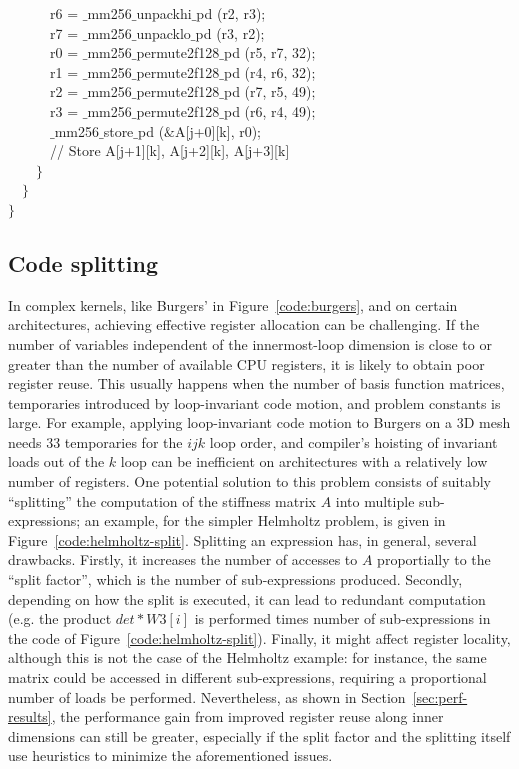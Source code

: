 \documentclass[conference]{IEEEtran}
\begin{document}
\begin{algorithm}[t]
~~~~~~r6 = $\_$mm256$\_$unpackhi$\_$pd (r2, r3);\\
~~~~~~r7 = $\_$mm256$\_$unpacklo$\_$pd (r3, r2);\\
~~~~~~r0 = $\_$mm256$\_$permute2f128$\_$pd (r5, r7, 32);\\
~~~~~~r1 = $\_$mm256$\_$permute2f128$\_$pd (r4, r6, 32);\\
~~~~~~r2 = $\_$mm256$\_$permute2f128$\_$pd (r7, r5, 49);\\
~~~~~~r3 = $\_$mm256$\_$permute2f128$\_$pd (r6, r4, 49);\\
~~~~~~$\_$mm256$\_$store$\_$pd ($\&$A[j+0][k], r0);\\
~~~~~~// Store A[j+1][k], A[j+2][k], A[j+3][k]\\
~~~~$\rbrace$\\
~~$\rbrace$\\
$\rbrace$
\end{algorithm}


\subsection{Code splitting}
In complex kernels, like Burgers' in Figure~\ref{code:burgers}, and on certain architectures, achieving effective register allocation can be challenging. If the number of variables independent of the innermost-loop dimension is close to or greater than the number of available CPU registers, it is likely to obtain poor register reuse. This usually happens when the number of basis function matrices, temporaries introduced by loop-invariant code motion, and problem constants is large. For example, applying loop-invariant code motion to Burgers on a 3D mesh needs 33 temporaries for the $ijk$ loop order, and compiler's hoisting of invariant loads out of the $k$ loop can be inefficient on architectures with a relatively low number of registers. One potential solution to this problem consists of suitably ``splitting'' the computation of the stiffness matrix $A$ into multiple sub-expressions; an example, for the simpler Helmholtz problem, is given in Figure~\ref{code:helmholtz-split}. Splitting an expression has, in general, several drawbacks. Firstly, it increases the number of accesses to $A$ proportially to the ``split factor'', which is the number of sub-expressions produced. Secondly, depending on how the split is executed, it can lead to redundant computation (e.g. the product $det*W3[i]$ is performed times number of sub-expressions in the code of Figure~\ref{code:helmholtz-split}). Finally, it might affect register locality, although this is not the case of the Helmholtz example: for instance, the same matrix could be accessed in different sub-expressions, requiring a proportional number of loads be performed. Nevertheless, as shown in Section~\ref{sec:perf-results}, the performance gain from improved register reuse along inner dimensions can still be greater, especially if the split factor and the splitting itself use heuristics to minimize the aforementioned issues.
\end{document}
